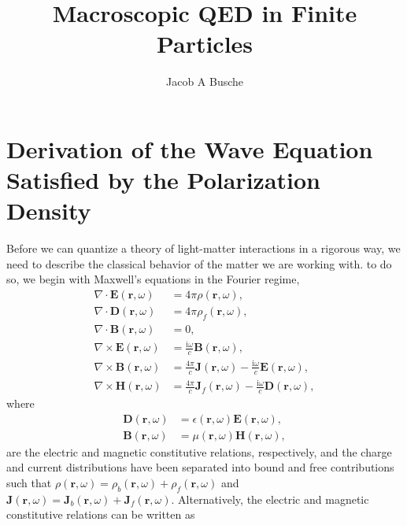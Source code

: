 \documentclass{article}
\begin{document}
\title{Macroscopic QED in Finite Particles}
\author{Jacob A Busche}
\maketitle


\newpage

\section{Derivation of the Wave Equation Satisfied by the Polarization Density}\label{app:polarizationWaveEquation}

Before we can quantize a theory of light-matter interactions in a rigorous way, we need to describe the classical behavior of the matter we are working with. to do so, we begin with Maxwell's equations in the Fourier regime,
\begin{equation}
\begin{split}
\nabla\cdot\mathbf{E}(\mathbf{r},\omega) &= 4\pi\rho(\mathbf{r},\omega),\\
\nabla\cdot\mathbf{D}(\mathbf{r},\omega) &= 4\pi\rho_f(\mathbf{r},\omega),\\
\nabla\cdot\mathbf{B}(\mathbf{r},\omega) &= 0,\\
\nabla\times\mathbf{E}(\mathbf{r},\omega) &= \frac{\mathrm{i}\omega}{c}\mathbf{B}(\mathbf{r},\omega),\\
\nabla\times\mathbf{B}(\mathbf{r},\omega) &= \frac{4\pi}{c}\mathbf{J}(\mathbf{r},\omega) - \frac{\mathrm{i}\omega}{c}\mathbf{E}(\mathbf{r},\omega),\\
\nabla\times\mathbf{H}(\mathbf{r},\omega) &= \frac{4\pi}{c}\mathbf{J}_f(\mathbf{r},\omega) - \frac{\mathrm{i}\omega}{c}\mathbf{D}(\mathbf{r},\omega),
\end{split}
\end{equation}
where
\begin{equation}
\begin{split}
\mathbf{D}(\mathbf{r},\omega) &= \epsilon(\mathbf{r},\omega)\mathbf{E}(\mathbf{r},\omega),\\
\mathbf{B}(\mathbf{r},\omega) &= \mu(\mathbf{r},\omega)\mathbf{H}(\mathbf{r},\omega),
\end{split}
\end{equation}
are the electric and magnetic constitutive relations, respectively, and the charge and current distributions have been separated into bound and free contributions such that $\rho(\mathbf{r},\omega) = \rho_b(\mathbf{r},\omega) + \rho_f(\mathbf{r},\omega)$ and $\mathbf{J}(\mathbf{r},\omega) = \mathbf{J}_b(\mathbf{r},\omega) + \mathbf{J}_f(\mathbf{r},\omega)$. Alternatively, the electric and magnetic constitutive relations can be written as
\end{document}
